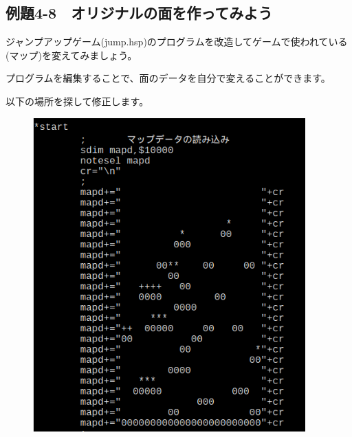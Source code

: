 \newpage
\subsection{例題4-8　オリジナルの面を作ってみよう}


\begin{description}
    \item {}
\end{description}

ジャンプアップゲーム(jump.hsp)のプログラムを改造してゲームで使われている(マップ)を変えてみましょう。

プログラムを編集することで、面のデータを自分で変えることができます。

以下の場所を探して修正します。


\begin{figure}[H]
    \begin{center}
      \includegraphics[keepaspectratio,width=10.478cm,height=12.07cm]{text04-img/s_jumpmapsrc.png}
    \end{center}
    \label{fig:prog_menu}
\end{figure}



\begin{description}
    \item {}
    \item {}
    \item {}
\end{description}

